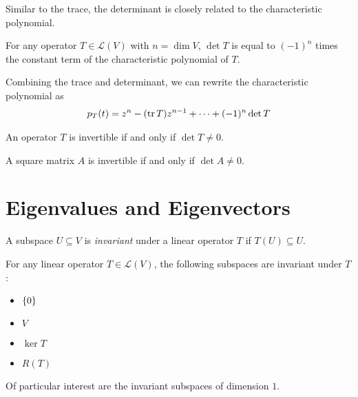 \documentclass{article}
\begin{document}
Similar to the trace, the determinant is closely related to the characteristic polynomial.

\begin{theorem}
  For any operator $T \in \mathcal{L}(V)$ with $n = \dim V$, $\det T$ is equal to $(-1)^n$ times the constant term of the characteristic polynomial of $T$.
\end{theorem}

\begin{remark}
  Combining the trace and determinant, we can rewrite the characteristic polynomial as
  \begin{align}
    p_T(t) = z^n - (\tr T)z^{n - 1} + \cdots + (-1)^n \det T
  \end{align}
\end{remark}

\begin{theorem}
  An operator $T$ is invertible if and only if $\det T \neq 0$.
\end{theorem}

\begin{theorem}
  A square matrix $A$ is invertible if and only if $\det A \neq 0$.
\end{theorem}

\section{Eigenvalues and Eigenvectors}

\begin{definition}
  A subspace $U \subseteq V$ is \emph{invariant} under a linear operator $T$ if $T(U) \subseteq U$.
\end{definition}

\begin{example}
  For any linear operator $T \in \mathcal{L}(V)$, the following subspaces are invariant under $T$:
  \begin{itemize}
    \item $\{0\}$
    \item $V$
    \item $\ker T$
    \item $R(T)$
  \end{itemize}
\end{example}

Of particular interest are the invariant subspaces of dimension $1$.
\end{document}
